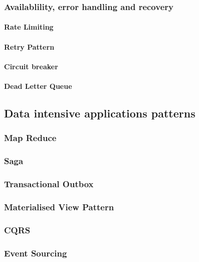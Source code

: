 \documentclass[a4paper, 11pt]{book}
\begin{document}
    \subsubsection{Availablility, error handling and recovery}

    \paragraph{Rate Limiting}

    \paragraph{Retry Pattern}

    \paragraph{Circuit breaker}

    \paragraph{Dead Letter Queue}

    \subsection{Data intensive applications patterns}
    \subsubsection{Map Reduce}
    \subsubsection{Saga}
    \subsubsection{Transactional Outbox}
    \subsubsection{Materialised View Pattern}
    \subsubsection{CQRS}
    \subsubsection{Event Sourcing}
\end{document}
